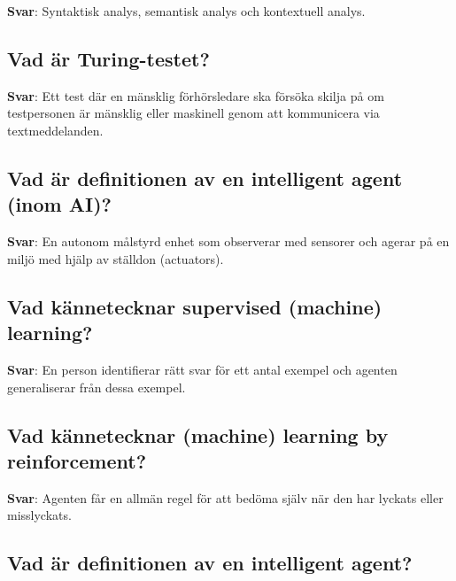 \documentclass[a4paper,11pt,oneside]{article}
\begin{document}
\begin{sloppypar}
\label{q:321:sa:sv:True}

\textbf{Svar}: Syntaktisk analys, semantisk analys och kontextuell analys.



\subsection{Vad \"ar Turing-testet?}

\label{q:322:sa:sv:True}

\textbf{Svar}: Ett test d\"ar en m\"ansklig f\"orh\"orsledare ska f\"ors\"oka skilja p\r{a} om testpersonen \"ar m\"ansklig eller maskinell genom att kommunicera via textmeddelanden.



\subsection{Vad \"ar definitionen av en intelligent agent (inom AI)?}

\label{q:323:sa:sv:True}

\textbf{Svar}: En autonom m\r{a}lstyrd enhet som observerar med sensorer och agerar p\r{a} en milj\"o med hj\"alp av st\"alldon (actuators).



\subsection{Vad k\"annetecknar supervised (machine) learning?}

\label{q:324:sa:sv:True}

\textbf{Svar}: En person identifierar r\"att svar f\"or ett antal exempel och agenten generaliserar fr\r{a}n dessa exempel.



\subsection{Vad k\"annetecknar (machine) learning by reinforcement?}

\label{q:325:sa:sv:True}

\textbf{Svar}: Agenten f\r{a}r en allm\"an regel f\"or att bed\"oma sj\"alv n\"ar den har lyckats eller misslyckats.



\subsection{Vad \"ar definitionen av en intelligent agent?}


\end{sloppypar}
\end{document}
